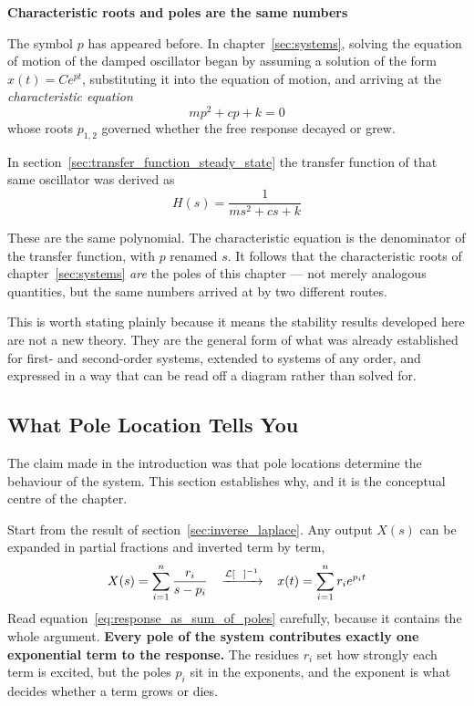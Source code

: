 \documentclass[12pt,letter]{article}
\begin{document}
\begin{review}
	\label{sec:characteristic_roots_are_poles}
	\textbf{Characteristic roots and poles are the same numbers}

	The symbol $p$ has appeared before. In chapter~\ref{sec:systems}, solving the equation of motion of the damped oscillator began by assuming a solution of the form $x(t) = Ce^{pt}$, substituting it into the equation of motion, and arriving at the \emph{characteristic equation}
	\begin{equation}
		mp^2 + cp + k = 0
	\end{equation}
	whose roots $p_{1,2}$ governed whether the free response decayed or grew.

	In section~\ref{sec:transfer_function_steady_state} the transfer function of that same oscillator was derived as
	\begin{equation}
		H(s) = \frac{1}{ms^2+cs+k}
	\end{equation}

	These are the same polynomial. The characteristic equation is the denominator of the transfer function, with $p$ renamed $s$. It follows that the characteristic roots of chapter~\ref{sec:systems} \emph{are} the poles of this chapter --- not merely analogous quantities, but the same numbers arrived at by two different routes.

	This is worth stating plainly because it means the stability results developed here are not a new theory. They are the general form of what was already established for first- and second-order systems, extended to systems of any order, and expressed in a way that can be read off a diagram rather than solved for.
\end{review}


\subsection{What Pole Location Tells You}
\label{sec:pole_location}

The claim made in the introduction was that pole locations determine the behaviour of the system. This section establishes why, and it is the conceptual centre of the chapter.

Start from the result of section~\ref{sec:inverse_laplace}. Any output $X(s)$ can be expanded in partial fractions and inverted term by term,
\begin{equation}
	X(s) = \sum_{i=1}^{n} \frac{r_i}{s-p_i} \; \; \; \xrightarrow{\mathcal{L}{\left[\; \; \;\right]}^{-1}} \; \; \; x(t) = \sum_{i=1}^{n} r_i e^{p_i t}
	\label{eq:response_as_sum_of_poles}
\end{equation}
Read equation~\ref{eq:response_as_sum_of_poles} carefully, because it contains the whole argument. \textbf{Every pole of the system contributes exactly one exponential term to the response.} The residues $r_i$ set how strongly each term is excited, but the poles $p_i$ sit in the exponents, and the exponent is what decides whether a term grows or dies.
\end{document}
